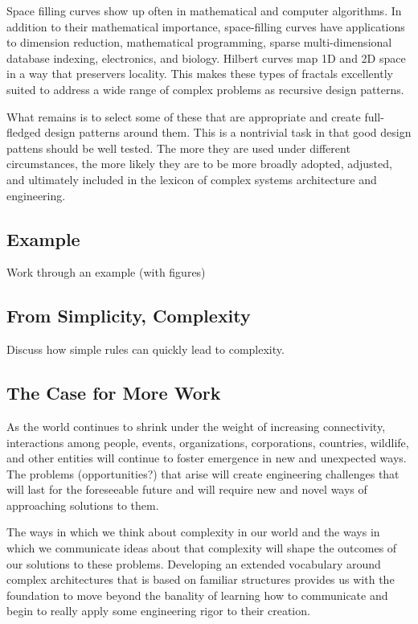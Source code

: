 \documentclass[jou,apacite]{apa6}
\begin{document}
Space filling curves show up often in mathematical and computer algorithms.  In addition to their mathematical importance, space-filling curves have applications to dimension reduction, mathematical programming, sparse multi-dimensional database indexing, electronics, and biology.  Hilbert curves map 1D and 2D space in a way that preservers locality.  This makes these types of fractals excellently suited to address a wide range of complex problems as recursive design patterns.

What remains is to select some of these that are appropriate and create full-fledged design patterns around them.  This is a nontrivial task in that good design pattens should be well tested.  The more they are used under different circumstances, the more likely they are to be more broadly adopted, adjusted, and ultimately included in the lexicon of complex systems architecture and engineering.

\subsection{Example} %
Work through an example (with figures)

\subsection{From Simplicity, Complexity}
Discuss how simple rules can quickly lead to complexity.

\subsection{The Case for More Work}
As the world continues to shrink under the weight of increasing connectivity, interactions among people, events, organizations, corporations, countries, wildlife, and other entities will continue to foster emergence in new and unexpected ways.  The problems (opportunities?) that arise will create engineering challenges that will last for the foreseeable future and will require new and novel ways of approaching solutions to them.

The ways in which we think about complexity in our world and the ways in which we communicate ideas about that complexity will shape the outcomes of our solutions to these problems.  Developing an extended vocabulary around complex architectures that is based on familiar structures provides us with the foundation to move beyond the banality of learning how to communicate and begin to really apply some engineering rigor to their creation.
\end{document}
